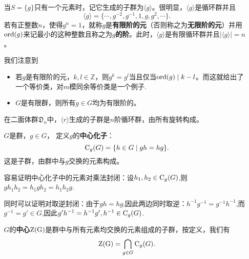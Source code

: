 \documentclass[lang=cn,10pt]{elegantbook}
\begin{document}
	\begin{proposition}[有限阶]
		当$S=\{g\}$只有一个元素时，记它生成的子群为$\langle g\rangle$。很明显，$\langle g\rangle$是循环群并且
		\[\langle g\rangle=\{\cdots, g^{-2},g^{-1},1,g,g^2,\cdots\}.\]
		若有正整数$n$，使得$g^n=1$，就称$g$是{\bf 有限阶的元}（否则称之为{\bf 无限阶的元}）并用${\rm ord}(g)$来记最小的这种整数且称之为{\bf $g$的阶}。此时，$\langle g\rangle$是有限循环群并且$|\langle g\rangle|=n$。
		
		我们注意到
		\begin{itemize}
			\item 若$g$是有限阶的元，$k,l\in $\(\mathbb{Z}\)，则$g^k=g^l$当且仅当${\rm ord}(g)\mid k-l$。而这就给出了一个等价类，对\(m\)模同余等价类是一个例子.
			\item $G$是有限群，则所有$g\in G$均为有限阶的。
		\end{itemize}
		
		在二面体群$\mathfrak{D}_n$中，$\langle r\rangle$生成的子群是$n$阶循环群，由所有旋转构成。
	\end{proposition}
	\begin{definition}
		$G$是群，$g\in G$， 定义$g$的{\bf 中心化子}：
		\[{\rm C}_g(G)=\{h\in G\mid gh=hg\}.\]
		这是子群，由群中与$g$交换的元素构成。
		
		容易证明中心化子中的元素对乘法封闭：设\(h_1,h_2\in {\rm C}_g(G)\),则\(gh_1h_2=h_1gh_2=h_1h_2g\).
		
		同时可以证明对取逆封闭：由于\(gh=hg\),因此两边同时取逆：\(h^{-1}g^{-1}=g^{-1}h^{-1}\),而\(g^{-1}=g'\in G\),因此\(g'h^{-1}=h^{-1}g',h^{-1}\in {\rm C}_g(G)\).
		
		$G$的{\bf 中心}${\rm Z(G)}$是群中与所有元素均交换的元素组成的子群，按定义，我们有
		\[{\rm Z(G)}=\bigcap_{g\in G}{\rm C}_g(G).\]
	\end{definition}
	
\end{document}
